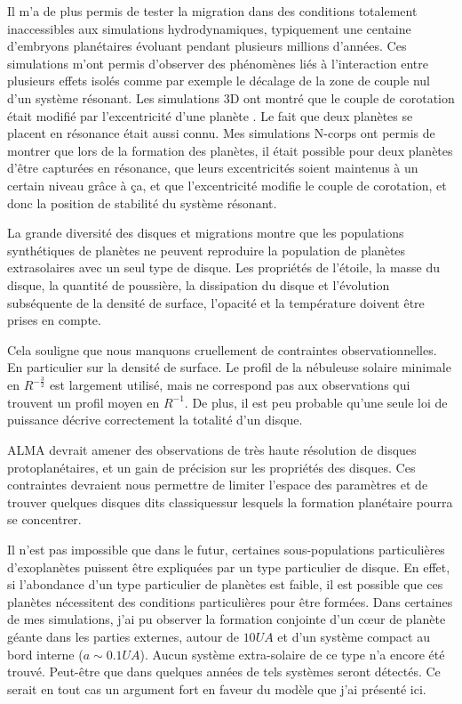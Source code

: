 Il m'a de plus permis de tester la migration dans des conditions totalement inaccessibles aux simulations hydrodynamiques, typiquement une centaine d'embryons planétaires évoluant pendant plusieurs millions d'années. Ces simulations m'ont permis d'observer des phénomènes liés à l'interaction entre plusieurs effets isolés comme par exemple le décalage de la zone de couple nul d'un système résonant. Les simulations 3D ont montré que le couple de corotation était modifié par l'excentricité d'une planète \citep{bitsch2010orbital}. Le fait que deux planètes se placent en résonance était aussi connu. Mes simulations N-corps ont permis de montrer que lors de la formation des planètes, il était possible pour deux planètes d'être capturées en résonance, que leurs excentricités soient maintenus à un certain niveau grâce à ça, et que l'excentricité modifie le couple de corotation, et donc la position de stabilité du système résonant\citep{cossou2013convergence}. 

\bigskip

La grande diversité des disques et migrations montre que les populations synthétiques de planètes ne peuvent reproduire la population de planètes extrasolaires avec un seul type de disque. Les propriétés de l'étoile, la masse du disque, la quantité de poussière, la dissipation du disque et l'évolution subséquente de la densité de surface, l'opacité et la température doivent être prises en compte. 

Cela souligne que nous manquons cruellement de contraintes observationnelles. En particulier sur la densité de surface. Le profil de la nébuleuse solaire minimale en $R^{-\frac{3}{2}}$ est largement utilisé, mais ne correspond pas aux observations qui trouvent un profil moyen en $R^{-1}$. De plus, il est peu probable qu'une seule loi de puissance décrive correctement la totalité d'un disque. 

ALMA devrait amener des observations de très haute résolution de disques protoplanétaires, et un gain de précision sur les propriétés des disques. Ces contraintes devraient nous permettre de limiter l'espace des paramètres et de trouver quelques disques dits \og classiques\fg sur lesquels la formation planétaire pourra se concentrer. 

Il n'est pas impossible que dans le futur, certaines sous-populations particulières d'exoplanètes puissent être expliquées par
un type particulier de disque. En effet, si l'abondance d'un type particulier de planètes est faible, il est possible que ces
planètes nécessitent des conditions particulières pour être formées. Dans certaines de mes simulations, j'ai pu observer la
formation conjointe d'un cœur de planète géante dans les parties externes, autour de $10\unit{UA}$ et d'un système compact au
bord interne ($a\sim 0.1\unit{UA}$). Aucun système extra-solaire de ce type n'a encore été trouvé. Peut-être que dans quelques
années de tels systèmes seront détectés. Ce serait en tout cas un argument fort en faveur du modèle que j'ai présenté ici. 

